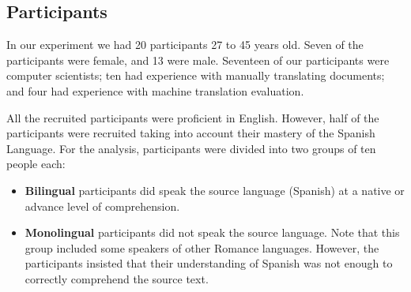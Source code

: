 \subsection{Participants}


In our experiment we had 20 participants 27 to 45 years old. Seven of the participants were female, and 13 were male. Seventeen of our participants were computer scientists; ten had experience with manually translating documents; and four had experience with machine translation evaluation.  


All the recruited participants were proficient in English. However, half of the participants were recruited taking into account their mastery of the Spanish Language. For the analysis, participants were divided into two groups of ten people each: 

\begin{itemize}
  \item {\bf{Bilingual}} participants did speak the source language (Spanish) at a native or advance level of comprehension.

  \item {\bf{Monolingual}} participants did not speak the source language. Note that this group included some speakers of other Romance languages. However, the participants insisted that their understanding of Spanish was not enough to correctly comprehend the source text. 
\end{itemize}   


